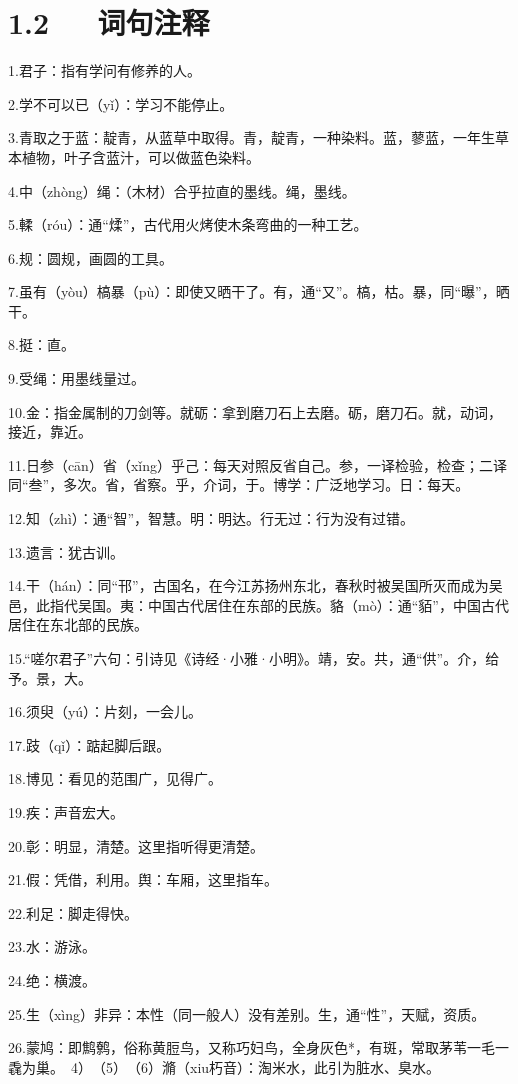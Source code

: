 \documentclass[letterpaper,10pt,english]{sphinxmanual}
\begin{document}
\section{1.2   词句注释}
\label{\detokenize{p01_u6563_u6587/_u8340_u5b50-_u529d_u5b66:id4}}
1.君子：指有学问有修养的人。

2.学不可以已（yǐ）：学习不能停止。

3.青取之于蓝：靛青，从蓝草中取得。青，靛青，一种染料。蓝，蓼蓝，一年生草本植物，叶子含蓝汁，可以做蓝色染料。

4.中（zhòng）绳：（木材）合乎拉直的墨线。绳，墨线。

5.輮（róu）：通“煣”，古代用火烤使木条弯曲的一种工艺。

6.规：圆规，画圆的工具。

7.虽有（yòu）槁暴（pù）：即使又晒干了。有，通“又”。槁，枯。暴，同“曝”，晒干。

8.挺：直。

9.受绳：用墨线量过。

10.金：指金属制的刀剑等。就砺：拿到磨刀石上去磨。砺，磨刀石。就，动词，接近，靠近。

11.日参（cān）省（xǐng）乎己：每天对照反省自己。参，一译检验，检查；二译同“叁”，多次。省，省察。乎，介词，于。博学：广泛地学习。日：每天。

12.知（zhì）：通“智”，智慧。明：明达。行无过：行为没有过错。

13.遗言：犹古训。

14.干（hán）：同“邗”，古国名，在今江苏扬州东北，春秋时被吴国所灭而成为吴邑，此指代吴国。夷：中国古代居住在东部的民族。貉（mò）：通“貊”，中国古代居住在东北部的民族。

15.“嗟尔君子”六句：引诗见《诗经·小雅·小明》。靖，安。共，通“供”。介，给予。景，大。

16.须臾（yú）：片刻，一会儿。

17.跂（qǐ）：踮起脚后跟。

18.博见：看见的范围广，见得广。

19.疾：声音宏大。

20.彰：明显，清楚。这里指听得更清楚。

21.假：凭借，利用。舆：车厢，这里指车。

22.利足：脚走得快。

23.水：游泳。

24.绝：横渡。

25.生（xìng）非异：本性（同一般人）没有差别。生，通“性”，天赋，资质。

26.蒙鸠：即鹪鹩，俗称黄脰鸟，又称巧妇鸟，全身灰色*，有斑，常取茅苇一毛一毳为巢。　4）　（5）　（6）滫（xiu朽音）：淘米水，此引为脏水、臭水。
\end{document}
